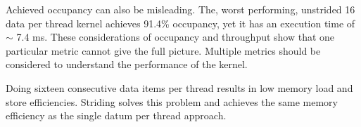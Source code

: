 \documentclass[a4paper,12pt]{article}
\begin{document}
  Achieved occupancy can also be misleading.
  The, worst performing, unstrided 16 data per thread kernel achieves 91.4\% occupancy, yet it has an execution time of $\sim$ 7.4 ms.
  These considerations of occupancy and throughput show that one particular metric cannot give the full picture.
  Multiple metrics should be considered to understand the performance of the kernel.

  Doing sixteen consecutive data items per thread results in low memory load and store efficiencies.
  Striding solves this problem and achieves the same memory efficiency as the single datum per thread approach.
\end{document}
